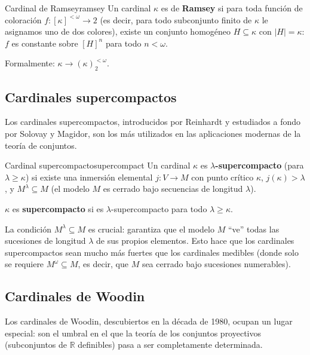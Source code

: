 \begin{definicion}{Cardinal de Ramsey}{ramsey}
Un cardinal $\kappa$ es de \textbf{Ramsey} si para toda función de coloración $f: [\kappa]^{<\omega} \to 2$ (es decir, para todo subconjunto finito de $\kappa$ le asignamos uno de dos colores), existe un conjunto homogéneo $H \subseteq \kappa$ con $|H| = \kappa$: $f$ es constante sobre $[H]^n$ para todo $n < \omega$.

Formalmente: $\kappa \to (\kappa)^{<\omega}_2$.
\end{definicion}

\subsection{Cardinales supercompactos}

Los cardinales supercompactos, introducidos por Reinhardt y estudiados a fondo por Solovay y Magidor, son los más utilizados en las aplicaciones modernas de la teoría de conjuntos.

\begin{definicion}{Cardinal supercompacto}{supercompact}
Un cardinal $\kappa$ es \textbf{$\lambda$-supercompacto} (para $\lambda \geq \kappa$) si existe una inmersión elemental $j: V \to M$ con punto crítico $\kappa$, $j(\kappa) > \lambda$, y $M^\lambda \subseteq M$ (el modelo $M$ es cerrado bajo secuencias de longitud $\lambda$).

$\kappa$ es \textbf{supercompacto} si es $\lambda$-supercompacto para todo $\lambda \geq \kappa$.
\end{definicion}

\begin{importante}
La condición $M^\lambda \subseteq M$ es crucial: garantiza que el modelo $M$ ``ve'' todas las sucesiones de longitud $\lambda$ de sus propios elementos. Esto hace que los cardinales supercompactos sean mucho más fuertes que los cardinales medibles (donde solo se requiere $M^\omega \subseteq M$, es decir, que $M$ sea cerrado bajo sucesiones numerables).
\end{importante}

\subsection{Cardinales de Woodin}

Los cardinales de Woodin, descubiertos en la década de 1980, ocupan un lugar especial: son el umbral en el que la teoría de los conjuntos proyectivos (subconjuntos de $\mathbb{R}$ definibles) pasa a ser completamente determinada.

